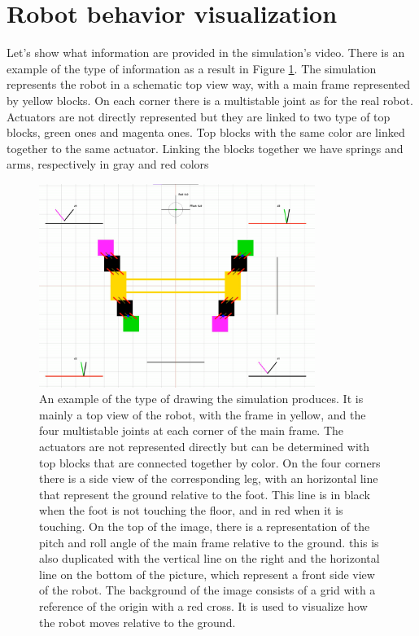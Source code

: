     \section{Robot behavior visualization}
        Let's show what information are provided in the simulation's video. There is an example of the type of information as a result in Figure \ref{fig:drawing}. The simulation represents the robot in a schematic top view way, with a main frame represented by yellow blocks. On each corner there is a multistable joint as for the real robot. Actuators are not directly represented but they are linked to two type of top blocks, green ones and magenta ones. Top blocks with the same color are linked together to the same actuator. Linking the blocks together we have springs and arms, respectively in gray and red colors
        
        \begin{figure}[h]
            \centering
            \includegraphics[width=0.8\textwidth]{images/drawing.png}
            \caption{An example of the type of drawing the simulation produces. It is mainly a top view of the robot, with the frame in yellow, and the four multistable joints at each corner of the main frame. The actuators are not represented directly but can be determined with top blocks that are connected together by color. On the four corners there is a side view of the corresponding leg, with an horizontal line that represent the ground relative to the foot. This line is in black when the foot is not touching the floor, and in red when it is touching. On the top of the image, there is a representation of the pitch and roll angle of the main frame relative to the ground. this is also duplicated with the vertical line on the right and the horizontal line on the bottom of the picture, which represent a front side view of the robot. The background of the image consists of a grid with a reference of the origin with a red cross. It is used to visualize how the robot moves relative to the ground.}
            \label{fig:drawing}
        \end{figure}
        
